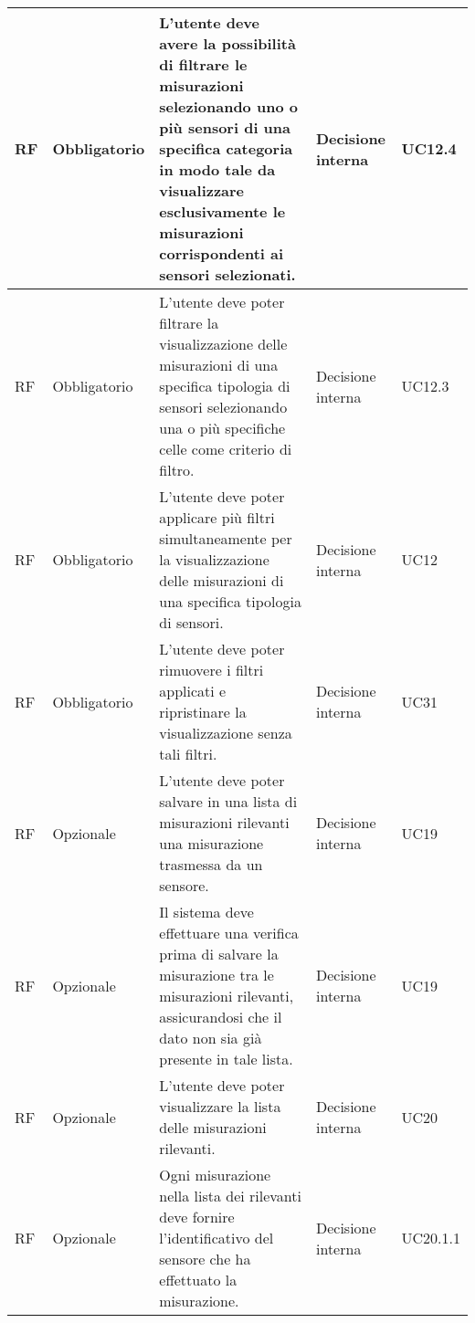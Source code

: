 \begin{longtable}{|C{1.5cm}|C{2cm}|L{5cm}|C{2cm}|C{1.5cm}|}
    \hline
     RF & Obbligatorio & L'utente deve avere la possibilità di filtrare le misurazioni selezionando uno o più sensori di una specifica categoria in modo tale da visualizzare esclusivamente le misurazioni corrispondenti ai sensori selezionati. & Decisione interna & UC12.4 \\
    
    \hline
     RF & Obbligatorio & L'utente deve poter filtrare la visualizzazione delle misurazioni di una specifica tipologia di sensori selezionando una o più specifiche celle come criterio di filtro. & Decisione interna & UC12.3 \\
    
    \hline
     RF & Obbligatorio & L'utente deve poter applicare più filtri simultaneamente per la visualizzazione delle misurazioni di una specifica tipologia di sensori. & Decisione interna & UC12 \\
    
    \hline
     RF & Obbligatorio & L'utente deve poter rimuovere i filtri applicati e ripristinare la visualizzazione senza tali filtri. & Decisione interna & UC31 \\
    
    \hline
     RF & Opzionale & L'utente deve poter salvare in una lista di misurazioni rilevanti una misurazione trasmessa da un sensore. & Decisione interna & UC19 \\
    
    \hline
     RF & Opzionale & Il sistema deve effettuare una verifica prima di salvare la misurazione tra le misurazioni rilevanti, assicurandosi che il dato non sia già presente in tale lista. & Decisione interna & UC19  \\
    
    \hline
     RF & Opzionale & L'utente deve poter visualizzare la lista delle misurazioni rilevanti. & Decisione interna & UC20 \\
    
    \hline
     RF & Opzionale & Ogni misurazione nella lista dei rilevanti deve fornire l'identificativo del sensore che ha effettuato la misurazione. & Decisione interna & UC20.1.1 \\


\end{longtable}
